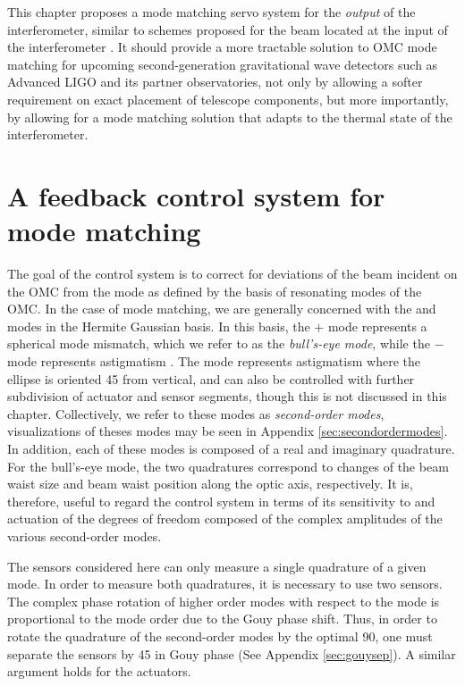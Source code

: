 This chapter proposes a mode matching servo system for the {\it output} of the interferometer, similar to schemes proposed for the beam located at the input of the interferometer \cite{Arain:10,Mueller:00}. %
It should provide a more tractable solution to OMC mode matching for upcoming second-generation gravitational wave detectors such as Advanced LIGO and its partner observatories, not only by allowing a softer requirement on exact placement of telescope components, but more importantly, by allowing for a mode matching solution that adapts to the thermal state of the interferometer.

\section{A feedback control system for mode matching}
The goal of the control system is to correct for deviations of the beam incident on the OMC from the  mode as defined by the basis of resonating modes of the OMC. %
In the case of mode matching, we are generally concerned with the  and  modes in the Hermite Gaussian basis. %
In this basis, the  $+$  mode represents a spherical mode mismatch, which we refer to as the \emph{bull's-eye mode}, while the  $-$  mode represents astigmatism \cite{Hefetz:97}. %
The  mode represents astigmatism where the ellipse is oriented 45\degrees{} from vertical, and can also be controlled with further subdivision of actuator and sensor segments, though this is not discussed in this chapter. %
Collectively, we refer to these modes as \emph{second-order modes}, visualizations of theses modes may be seen in Appendix \ref{sec:secondordermodes}. %
In addition, each of these modes is composed of a real and imaginary quadrature. %
For the bull's-eye mode, the two quadratures correspond to changes of the beam waist size and beam waist position along the optic axis, respectively. %
It is, therefore, useful to regard the control system in terms of its sensitivity to and actuation of the degrees of freedom composed of the complex amplitudes of the various second-order modes.

The sensors considered here can only measure a single quadrature of a given mode. %
In order to measure both quadratures, it is necessary to use two sensors. %
The complex phase rotation of higher order modes with respect to the  mode is proportional to the mode order due to the Gouy phase shift. %
Thus, in order to rotate the quadrature of the second-order modes by the optimal 90\degrees{}, one must separate the sensors by 45\degrees{} in Gouy phase (See Appendix \ref{sec:gouysep}). %
A similar argument holds for the actuators.

